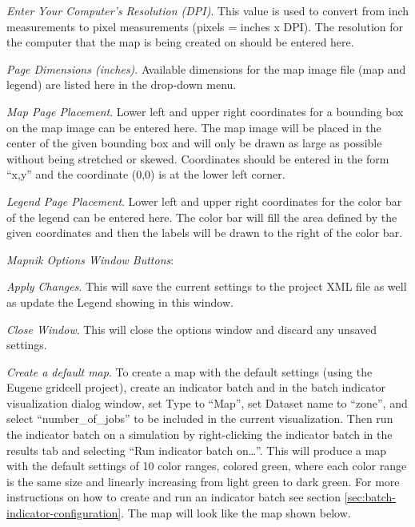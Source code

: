 \emph{Enter Your Computer's Resolution (DPI)}. 
This value is used to convert from inch measurements to pixel measurements 
(pixels = inches x DPI). The resolution for the computer that the map is 
being created on should be entered here.

\emph{Page Dimensions (inches)}. 
Available dimensions for the map image file (map and legend) are listed 
here in the drop-down menu.

\emph{Map Page Placement}. 
Lower left and upper right coordinates for a bounding box on the map image can 
be entered here. The map image will be placed in the center of the given 
bounding box and will only be drawn as large as possible without being stretched or 
skewed. Coordinates should be entered in the form ``x,y'' and the coordinate (0,0) 
is at the lower left corner.

\emph{Legend Page Placement}. 
Lower left and upper right coordinates for the color bar of the legend can be 
entered here. The color bar will fill the area defined by the given 
coordinates and then the labels will be drawn to the right of the color bar.

\emph{Mapnik Options Window Buttons}:

\emph{Apply Changes}. 
This will save the current settings to 
the project XML file as well as update the Legend showing in this window.

\emph{Close Window}. 
This will close the options window and discard any unsaved settings.


\clearpage
{}

\emph{Create a default map}. 
To create a map with the default settings 
(using the Eugene gridcell project), create an indicator batch and 
in the batch indicator visualization dialog window, set Type to 
``Map'', set Dataset name to ``zone'', and select ``number_of_jobs'' to be 
included in the current visualization.  Then run the indicator batch on 
a simulation by right-clicking the indicator batch in the results 
tab and selecting ``Run indicator batch on\ldots''. 
This will produce a map with the default 
settings of 10 color ranges, colored green, where each color range is 
the same size and linearly increasing from light green to dark green.
For more instructions on how to create and run an indicator batch see section
\ref{sec:batch-indicator-configuration}. The map will look like the 
map shown below.

